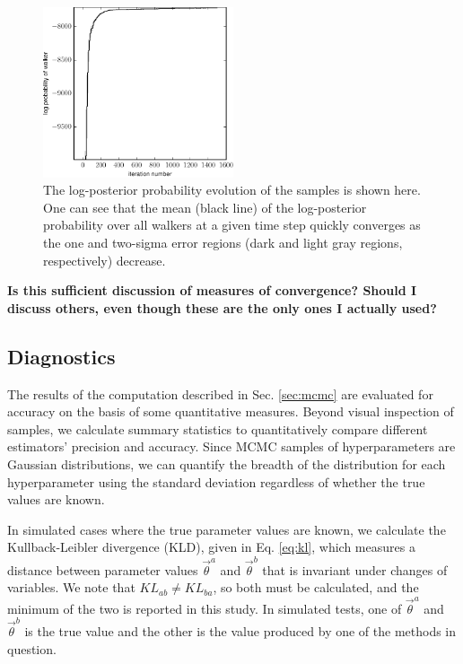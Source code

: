 \documentclass[preprint]{aastex}
\begin{document}
\begin{figure}
\includegraphics[width=0.5\textwidth]{figs/null/probs.pdf}
\caption{The log-posterior probability evolution of the samples is shown here.  
One can see that the mean (black line) of the log-posterior probability over 
all walkers at a given time step quickly converges as the one and two-sigma 
error regions (dark and light gray regions, respectively) decrease.}
\label{fig:probs}
\end{figure}

\textbf{Is this sufficient discussion of measures of convergence?  Should I 
discuss others, even though these are the only ones I actually used?}

\clearpage
\subsection{Diagnostics}
\label{sec:diag}

The results of the computation described in Sec. \ref{sec:mcmc} are evaluated 
for accuracy on the basis of some quantitative measures.  Beyond visual 
inspection of samples, we calculate summary statistics to quantitatively 
compare different estimators' precision and accuracy.  Since MCMC samples of 
hyperparameters are Gaussian distributions, we can quantify the breadth of the 
distribution for each hyperparameter using the standard deviation regardless of 
whether the true values are known.  

In simulated cases where the true parameter values are known, we calculate the 
Kullback-Leibler divergence (KLD), given in Eq. \ref{eq:kl}, which measures a 
distance between parameter values $\vec{\theta}^{a}$ and $\vec{\theta}^{b}$ 
that is invariant under changes of variables.  We note that $KL_{ab}\neq 
KL_{ba}$, so both must be calculated, and the minimum of the two is reported in 
this study.  In simulated tests, one of $\vec{\theta}^{a}$ and 
$\vec{\theta}^{b}$ is the true value and the other is the value produced by one 
of the methods in question.  
\end{document}
